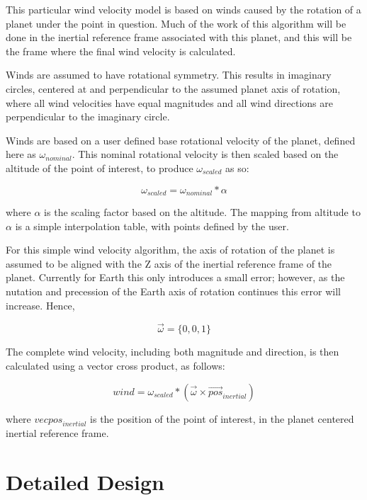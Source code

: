 This particular wind velocity model is based on winds caused by the rotation
of a planet under the point in question. Much of the work of this algorithm will
be done in the inertial reference frame associated with this
planet, and this will be the frame where the final wind velocity is calculated.

Winds are assumed to have rotational
symmetry. This results in imaginary circles,
centered at and perpendicular to the assumed
planet axis of rotation, where all wind velocities have equal magnitudes and
all wind directions are perpendicular to the imaginary circle.

Winds are based on a user defined base rotational velocity of the planet, defined
here as $\omega_{nominal}$. This nominal rotational velocity is then scaled based
on the altitude of the point of interest, to produce $\omega_{scaled}$ as so:

\begin{equation}\label{scaling_equation}
\omega_{scaled} = \omega_{nominal} * \alpha
\end{equation}

where $\alpha$ is the scaling factor based on the altitude. The mapping from
altitude to $\alpha$ is a simple interpolation table, with points defined by the
user.

For this simple wind velocity algorithm, the axis of rotation of the planet is
assumed to be aligned with the Z axis of the inertial reference frame of the planet.
Currently for Earth this only introduces a small error; however, as the nutation
and precession of the Earth axis of rotation continues this error will increase.
Hence,

\begin{equation}\label{axis_def}
\vec{\omega} = \{0, 0, 1\}
\end{equation}

The complete wind velocity, including both magnitude and direction, is then
calculated using a vector cross product, as follows:

\begin{equation}\label{final_wind_equation}
wind = \omega_{scaled} * \left(\vec{\omega}  \times \vec{pos}_{inertial}\right)
\end{equation}

where $vec{pos}_{inertial}$ is the position of the point of interest, in the
planet centered inertial reference frame.


\section{Detailed Design}


